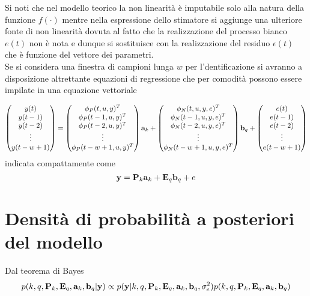 Si noti che nel modello teorico la non linearità è imputabile solo alla natura della funzione $f(\cdot)$ mentre nella espressione dello stimatore si aggiunge una ulteriore fonte di non linearità dovuta al fatto che la realizzazione del processo bianco $e(t)$ non è nota
e dunque si sostituisce con la realizzazione del residuo $\epsilon(t) $ che è funzione del vettore dei parametri.\\
Se si considera una finestra di campioni lunga $w$ per l'dentificazione si avranno a disposizione altrettante equazioni di regressione che per comodità possono essere impilate in una equazione vettoriale


\begin{equation}
\begin{pmatrix}
y(t) \\ 
y(t-1) \\ 
y(t-2) \\ 
\vdots \\ 
y(t-w+1)
\end{pmatrix} =\begin{pmatrix}
\phi_P(t,u,y)^T \\ 
\phi_P(t-1,u,y)^T \\ 
\phi_P(t-2,u,y)^T \\ 
\vdots \\ 
\phi_P(t-w+1,u,y)^T
\end{pmatrix}\textbf{a}_k+\begin{pmatrix}
\phi_N(t,u,y,e)^T \\ 
\phi_N(t-1,u,y,e)^T \\ 
\phi_N(t-2,u,y,e)^T \\ 
\vdots \\ 
\phi_N(t-w+1,u,y,e)^T
\end{pmatrix}\textbf{b}_q+\begin{pmatrix}
e(t) \\ 
e(t-1) \\ 
e(t-2) \\ 
\vdots \\ 
e(t-w+1)
\end{pmatrix}
\end{equation}
indicata compattamente come
\begin{equation}
\textbf{y}=\textbf{P}_k\textbf{a}_k+\textbf{E}_q\textbf{b}_q+e \label{reg}
\end{equation}

\section{Densità di probabilità a posteriori del modello}
Dal teorema di Bayes
\begin{equation}
p(k, q, \textbf{P}_k , \textbf{E}_q, \textbf{a}_k , \textbf{b}_q |\textbf{y}) \propto p(\textbf{y}|k, q, \textbf{P}_k ,\textbf{E}_q , \textbf{a}_k, \textbf{b}_q , \sigma_e^2 )p(k, q, \textbf{P}_k, \textbf{E}_q,\textbf{a}_k,\textbf{b}_q ) \label{post}
\end{equation}
